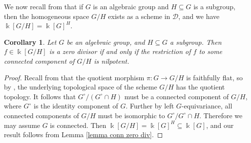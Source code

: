 \documentclass[11pt]{amsart}
\def\Ind{\operatorname{Ind}}
\def\Ds{\mathscr{D}}
\def\m{\mathfrak{m}}
\def\Rep{\operatorname{Rep}}
\def\sub{\subseteq}
\newtheorem{cor}[thm]{Corollary}
\newtheorem{lemma}[thm]{Lemma}
\theoremstyle{definition}
\theoremstyle{remark}
\numberwithin{equation}{section}
\begin{document}
We now recall from \cite{CS} that if $G$ is an algebraic group and $H\sub G$ is a subgroup, then the homogeneous space $G/H$ exists as a scheme in $\Ds$, and we have $\Bbbk[G/H]=\Bbbk[G]^H$.

\begin{cor}\label{cor zero div on G/H}
    Let $G$ be an algebraic group, and $H\sub G$ a subgroup.  Then $f\in\Bbbk[G/H]$ is a zero divisor if and only if the restriction of $f$ to some connected component of $G/H$ is nilpotent.
\end{cor}

\begin{proof}
Recall from \cite[Lem.~5.1]{CS} that the quotient morphism $\pi:G\to G/H$ is faithfully flat, so by \cite[\href{https://stacks.math.columbia.edu/tag/0254}{Tag 0254}]{stacks-project}, the underlying topological space of the scheme $G/H$ has the quotient topology.  It follows that  $G^{\circ}/(G^{\circ}\cap H)$ must be a connected component of $G/H$, where $G^{\circ}$ is the identity component of $G$.  Further by left $G$-equivariance, all connected components of $G/H$ must be isomorphic to $G^\circ/G^\circ\cap H$. Therefore we may assume $G$ is connected.  Then $\Bbbk[G/H]=\Bbbk[G]^{H}\sub\Bbbk[G]$, and our result follows from Lemma \ref{lemma conn zero div}.
\end{proof}






\end{document}
